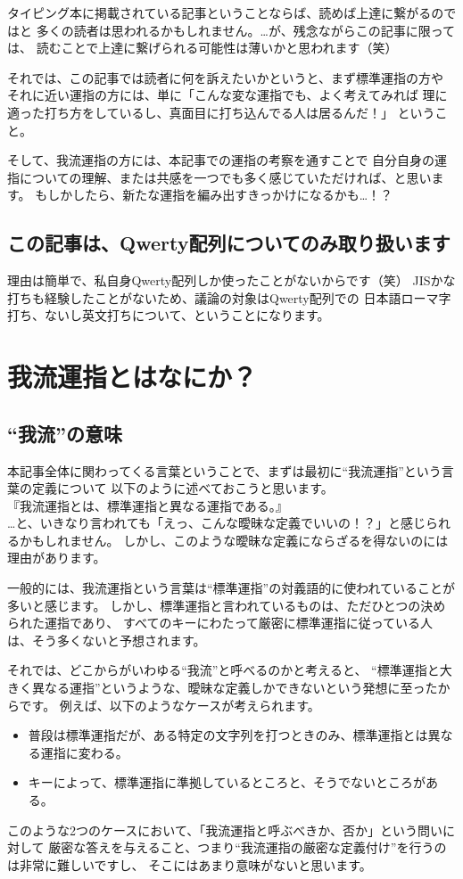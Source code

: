タイピング本に掲載されている記事ということならば、読めば上達に繋がるのではと
多くの読者は思われるかもしれません。…が、残念ながらこの記事に限っては、
読むことで上達に繋げられる可能性は薄いかと思われます（笑）

それでは、この記事では読者に何を訴えたいかというと、まず標準運指の方や
それに近い運指の方には、単に「こんな変な運指でも、よく考えてみれば
理に適った打ち方をしているし、真面目に打ち込んでる人は居るんだ！」
ということ。


そして、我流運指の方には、本記事での運指の考察を通すことで
自分自身の運指についての理解、または共感を一つでも多く感じていただければ、と思います。
もしかしたら、新たな運指を編み出すきっかけになるかも…！？

\subsection*{この記事は、Qwerty配列についてのみ取り扱います}

理由は簡単で、私自身Qwerty配列しか使ったことがないからです（笑）
JISかな打ちも経験したことがないため、議論の対象はQwerty配列での
日本語ローマ字打ち、ないし英文打ちについて、ということになります。


\section{我流運指とはなにか？}

\subsection{“我流”の意味}

本記事全体に関わってくる言葉ということで、まずは最初に“我流運指”という言葉の定義について
以下のように述べておこうと思います。\\

『我流運指とは、標準運指と異なる運指である。』\\

\noindent …と、いきなり言われても「えっ、こんな曖昧な定義でいいの！？」と感じられるかもしれません。
しかし、このような曖昧な定義にならざるを得ないのには理由があります。

一般的には、我流運指という言葉は“標準運指”の対義語的に使われていることが多いと感じます。
しかし、標準運指と言われているものは、ただひとつの決められた運指であり、
すべてのキーにわたって厳密に標準運指に従っている人は、そう多くないと予想されます。

それでは、どこからがいわゆる“我流”と呼べるのかと考えると、
“標準運指と大きく異なる運指”というような、曖昧な定義しかできないという発想に至ったからです。
例えば、以下のようなケースが考えられます。
\begin{itemize}
 \item 普段は標準運指だが、ある特定の文字列を打つときのみ、標準運指とは異なる運指に変わる。
 \item キーによって、標準運指に準拠しているところと、そうでないところがある。
\end{itemize}
このような2つのケースにおいて、「我流運指と呼ぶべきか、否か」という問いに対して
厳密な答えを与えること、つまり“我流運指の厳密な定義付け”を行うのは非常に難しいですし、
そこにはあまり意味がないと思います。

